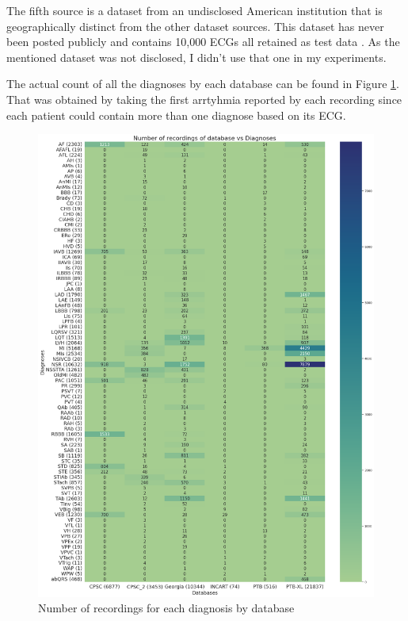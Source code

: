 The fifth source is a dataset from an undisclosed American institution that is geographically distinct from the other dataset sources. This dataset has never been posted publicly and contains 10,000 ECGs all retained as test data \cite{dataset2}. As the mentioned dataset was not disclosed, I didn't use that one in my experiments.

The actual count of all the diagnoses by each database can be found in Figure \ref{fig:diagnose_count_by_db}. That was obtained by taking the first arrtyhmia reported by each recording since each patient could contain more than one diagnose based on its ECG.

\begin{figure}[H]
\centering
\includegraphics[scale=0.3]{img/diagnose_count_by_db.png}
\caption{Number of recordings for each diagnosis by database}
\label{fig:diagnose_count_by_db}
\end{figure}

